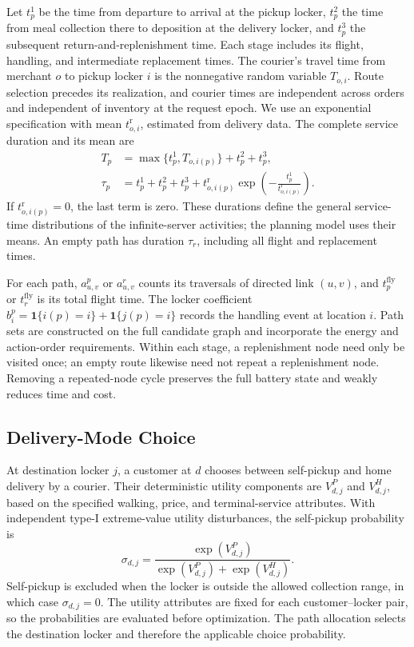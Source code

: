\documentclass[final,3p,authoryear]{elsarticle}
\begin{document}
Let $t_p^1$ be the time from departure to arrival at the pickup locker, $t_p^2$ the time from meal collection there to deposition at the delivery locker, and $t_p^3$ the subsequent return-and-replenishment time.
Each stage includes its flight, handling, and intermediate replacement times.
The courier's travel time from merchant $o$ to pickup locker $i$ is the nonnegative random variable $T_{o,i}$.
Route selection precedes its realization, and courier times are independent across orders and independent of inventory at the request epoch.
We use an exponential specification with mean $t_{o,i}^{\mathrm r}$, estimated from delivery data.
The complete service duration and its mean are
\begin{align}
 T_p&=\max\{t_p^1,T_{o,i(p)}\}+t_p^2+t_p^3,\label{eq:path_random_time}\\
 \tau_p&=t_p^1+t_p^2+t_p^3
 +t_{o,i(p)}^{\mathrm r}\exp\left(-\frac{t_p^1}{t_{o,i(p)}^{\mathrm r}}\right).
 \label{eq:path_mean_time}
\end{align}
If $t_{o,i(p)}^{\mathrm r}=0$, the last term is zero.
These durations define the general service-time distributions of the infinite-server activities; the planning model uses their means.
An empty path has duration $\tau_r$, including all flight and replacement times.

For each path, $a_{u,v}^{p}$ or $a_{u,v}^{r}$ counts its traversals of directed link $(u,v)$, and $t_p^{\mathrm{fly}}$ or $t_r^{\mathrm{fly}}$ is its total flight time.
The locker coefficient $b_i^p=\mathbf1\{i(p)=i\}+\mathbf1\{j(p)=i\}$ records the handling event at location $i$.
Path sets are constructed on the full candidate graph and incorporate the energy and action-order requirements.
Within each stage, a replenishment node need only be visited once; an empty route likewise need not repeat a replenishment node.
Removing a repeated-node cycle preserves the full battery state and weakly reduces time and cost.

\subsection{Delivery-Mode Choice}
\label{subsec:path_choice}

At destination locker $j$, a customer at $d$ chooses between self-pickup and home delivery by a courier.
Their deterministic utility components are $V_{d,j}^{P}$ and $V_{d,j}^{H}$, based on the specified walking, price, and terminal-service attributes.
With independent type-I extreme-value utility disturbances, the self-pickup probability is
\begin{equation}
 \sigma_{d,j}=\frac{\exp(V_{d,j}^{P})}
 {\exp(V_{d,j}^{P})+\exp(V_{d,j}^{H})}.
 \label{eq:path_choice}
\end{equation}
Self-pickup is excluded when the locker is outside the allowed collection range, in which case $\sigma_{d,j}=0$.
The utility attributes are fixed for each customer--locker pair, so the probabilities are evaluated before optimization.
The path allocation selects the destination locker and therefore the applicable choice probability.
\end{document}
